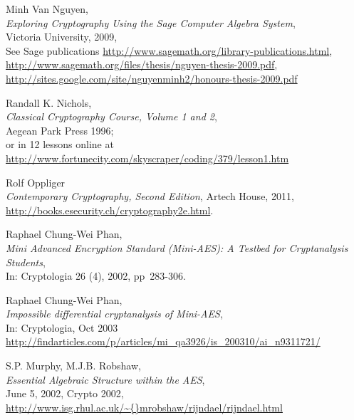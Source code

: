 \begin{thebibliography}{99999}
  
       Minh Van Nguyen, \\
       {\em Exploring Cryptography Using the Sage Computer Algebra System}, \\
       Victoria University, 2009, \\
       See Sage publications \url{http://www.sagemath.org/library-publications.html},\\
       \url{http://www.sagemath.org/files/thesis/nguyen-thesis-2009.pdf},\\
       \url{http://sites.google.com/site/nguyenminh2/honours-thesis-2009.pdf}

  
       Randall K. Nichols, \\
       {\em Classical Cryptography Course, Volume 1 and 2}, \\
       Aegean Park Press 1996;\\
       or in 12 lessons online at \\
       \url{http://www.fortunecity.com/skyscraper/coding/379/lesson1.htm}

 
       Rolf Oppliger \\
       {\em Contemporary Cryptography, Second Edition},
       Artech House, 2011, \\
       \url{http://books.esecurity.ch/cryptography2e.html}.

  
       Raphael Chung-Wei Phan, \\
       {\em Mini Advanced Encryption Standard (Mini-AES): A Testbed for
            Cryptanalysis Students}, \\
       In: Cryptologia 26 (4), 2002, pp~283-306.

  
       Raphael Chung-Wei Phan, \\
       {\em Impossible differential cryptanalysis of Mini-AES}, \\
       In: Cryptologia, Oct 2003\\
       \url{http://findarticles.com/p/articles/mi_qa3926/is_200310/ai_n9311721/}

  
       S.P. Murphy, M.J.B. Robshaw, \\
       {\em Essential Algebraic Structure within the AES}, \\
       June 5, 2002, Crypto 2002,  \\
       \url{http://www.isg.rhul.ac.uk/\~{}mrobshaw/rijndael/rijndael.html}


\end{thebibliography}
